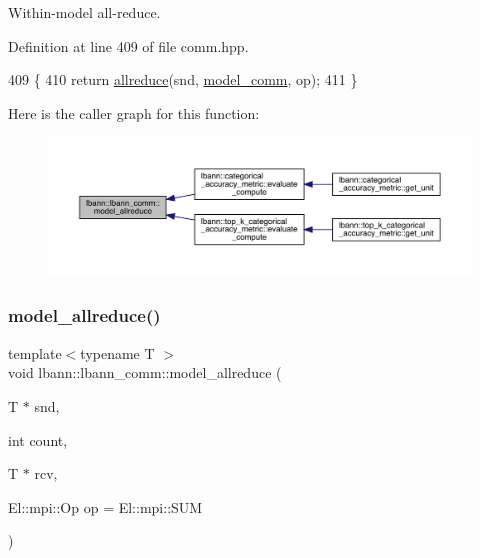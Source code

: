 Within-\/model all-\/reduce. 

Definition at line 409 of file comm.\+hpp.


\begin{DoxyCode}
409                                                   \{
410     \textcolor{keywordflow}{return} \hyperlink{classlbann_1_1lbann__comm_af5631e5f0f54e4df4958eba9df2599ef}{allreduce}(snd, \hyperlink{classlbann_1_1lbann__comm_a58a75b76bd61ec8a26c1cbbec3dc2f45}{model\_comm}, op);
411   \}
\end{DoxyCode}
Here is the caller graph for this function\+:\nopagebreak
\begin{figure}[H]
\begin{center}
\leavevmode
\includegraphics[width=350pt]{classlbann_1_1lbann__comm_aebb6290d1b618eace302404291c598a5_icgraph}
\end{center}
\end{figure}
\mbox{\label{classlbann_1_1lbann__comm_a6dce8c5dd188633e69e9d5c79e5ef1bd}} 
\subsubsection{\texorpdfstring{model\+\_\+allreduce()}{model\_allreduce()}\hspace{0.1cm}{\footnotesize\ttfamily [2/2]}}
{\footnotesize\ttfamily template$<$typename T $>$ \\
void lbann\+::lbann\+\_\+comm\+::model\+\_\+allreduce (\begin{DoxyParamCaption}\item[{T $\ast$}]{snd,  }\item[{int}]{count,  }\item[{T $\ast$}]{rcv,  }\item[{El\+::mpi\+::\+Op}]{op = {\ttfamily El\+:\+:mpi\+:\+:SUM} }\end{DoxyParamCaption})\hspace{0.3cm}{\ttfamily [inline]}}

